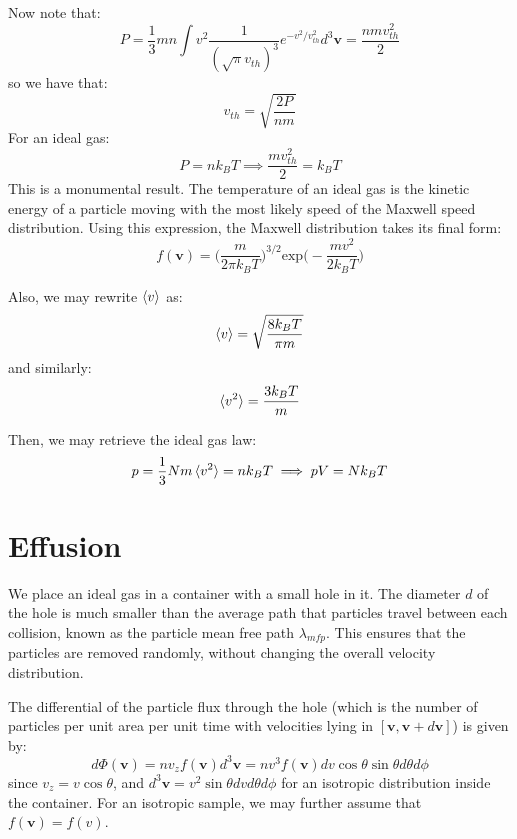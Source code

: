 \documentclass[a4paper,11pt,oneside]{book}
\newcommand{\BF}[1]{\boldsymbol{#1}}
\begin{document}
Now note that:
\begin{equation}
    P = \frac{1}{3} mn \int v^2 \frac{1}{(\sqrt{\pi}v_{th})^3}e^{-v^2/v_{th}^2}  d^3 \BF{v} = \frac{nmv_{th}^2}{2}
\end{equation}
so we have that:
\begin{equation}
    v_{th}=\sqrt{\frac{2P}{nm}}
\end{equation}
For an ideal gas:
\begin{equation}
    P = n k_B T \implies \boxed{\frac{mv_{th}^2}{2}=k_B T}
\end{equation}
This is a monumental result. The temperature of an ideal gas is the kinetic energy of a particle moving with the most likely speed of the Maxwell speed distribution. Using this expression, the Maxwell distribution takes its final form:
\begin{equation}
    \boxed{f(\BF{v}) = \bigg(\frac{m}{2\pi k_B T}\bigg)^{3/2}\text{exp}\bigg(-\frac{mv^2}{2k_B T}\bigg)}
\end{equation}

Also, we may rewrite $\braket{v}$ as:
\begin{equation}
    \braket{v} = \sqrt{\frac{8k_BT}{\pi m}}
\end{equation}
and similarly:
\begin{equation}
    \braket{v^2} = \frac{3k_BT}{m}
\end{equation}

Then, we may retrieve the ideal gas law:
\begin{equation}
    p = \frac{1}{3}Nm\braket{v^2} = nk_B T \implies pV = Nk_B T
\end{equation}

\section{Effusion}
We place an ideal gas in a container with a small hole in it. The diameter $d$ of the hole is much smaller than the average path that particles travel between each collision, known as the particle mean free path $\lambda_{mfp}$. This ensures that the particles are removed randomly, without changing the overall velocity distribution. 


The differential of the particle flux through the hole (which is the number of particles per unit area per unit time with velocities lying in $[\BF{v}, \BF{v}+d\BF{v}]$) is given by:
\begin{equation}
    d\Phi(\BF{v}) = nv_zf(\BF{v}) d^3\BF{v}=n v^3 f(\BF{v}) dv \cos \theta\sin \theta d\theta d\phi
\end{equation}
since $v_z=v\cos \theta$, and $d^3 \BF{v} = v^2 \sin \theta dv d\theta d\phi$ for an isotropic distribution inside the container. For an isotropic sample, we may further assume that $f(\BF{v}) = f(v)$. 
\end{document}

